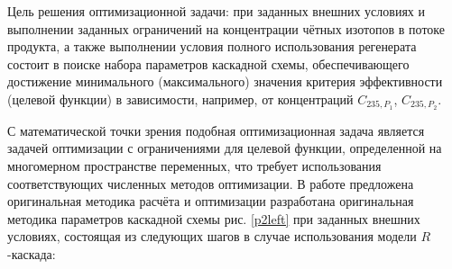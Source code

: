 {Цель решения оптимизационной задачи: при заданных внешних условиях и выполнении заданных ограничений на концентрации чётных изотопов в потоке продукта, а также выполнении условия полного использования регенерата состоит в поиске набора параметров каскадной схемы, обеспечивающего достижение минимального (максимального) значения критерия эффективности (целевой функции) в зависимости, например, от концентраций $C_{235,{P_1}}$, $C_{235,{P_2}}$.

С математической точки зрения подобная оптимизационная задача является задачей оптимизации с ограничениями для целевой функции, определенной на многомерном пространстве переменных, что требует использования соответствующих численных методов оптимизации. В работе предложена оригинальная методика расчёта и оптимизации разработана оригинальная методика параметров каскадной схемы рис. \ref{p2left} при заданных внешних условиях, состоящая из следующих шагов в случае использования модели $R$-каскада:

}
